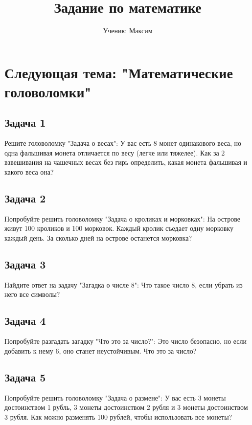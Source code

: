 \documentclass{article}
\begin{document}
\title{Задание по математике}
\author{Ученик: Максим}
\date{}
\maketitle

\section*{Следующая тема: "Математические головоломки"}

\subsection*{Задача 1}
Решите головоломку "Задача о весах":
У вас есть 8 монет одинакового веса, но одна фальшивая монета отличается по весу (легче или тяжелее). Как за 2 взвешивания на чашечных весах без гирь определить, какая монета фальшивая и какого веса она?

\subsection*{Задача 2}
Попробуйте решить головоломку "Задача о кроликах и морковках":
На острове живут 100 кроликов и 100 морковок. Каждый кролик съедает одну морковку каждый день. За сколько дней на острове останется морковка?

\subsection*{Задача 3}
Найдите ответ на задачу "Загадка о числе 8":
Что такое число 8, если убрать из него все символы?

\subsection*{Задача 4}
Попробуйте разгадать загадку "Что это за число?":
Это число безопасно, но если добавить к нему 6, оно станет неустойчивым. Что это за число?

\subsection*{Задача 5}
Попробуйте решить головоломку "Задача о размене":
У вас есть 3 монеты достоинством 1 рубль, 3 монеты достоинством 2 рубля и 3 монеты достоинством 3 рубля. Как можно разменять 100 рублей, чтобы использовать все монеты?
\end{document}
